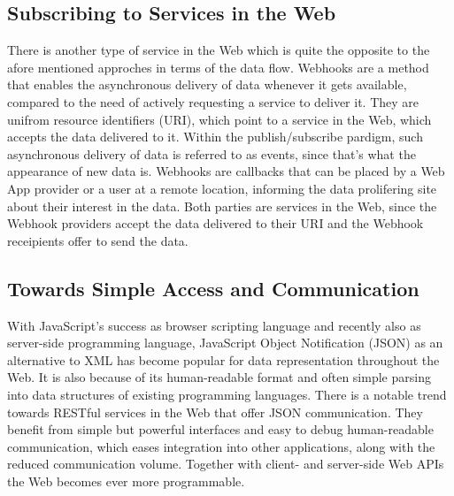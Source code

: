 \subsection{Subscribing to Services in the Web}
There is another type of service in the Web which is quite the opposite to the afore mentioned approches in terms of the data flow.
\textrm{Webhooks} are a method that enables the asynchronous delivery of data whenever it gets available, compared to the need of actively requesting a service to deliver it.
They are unifrom resource identifiers (\textrm{URI}), which point to a service in the Web, which accepts the data delivered to it.
Within the publish/subscribe pardigm, such asynchronous delivery of data is referred to as events, since that's what the appearance of new data is.
\textrm{Webhooks} are callbacks that can be placed by a \textrm{Web App} provider or a user at a remote location, informing the data prolifering site about their interest in the data.
Both parties are services in the Web, since the \textrm{Webhook} providers accept the data delivered to their \textrm{URI} and the \textrm{Webhook} receipients offer to send the data.


\subsection{Towards Simple Access and Communication}
With JavaScript's success as browser scripting language and recently also as server-side programming language, JavaScript Object Notification (\textrm{JSON}) as an alternative to \textrm{XML} has become popular for data representation throughout the Web.
It is also because of its human-readable format and often simple parsing into data structures of existing programming languages.
There is a notable trend towards \textrm{RESTful} services in the Web that offer \textrm{JSON} communication.
They benefit from simple but powerful interfaces and easy to debug human-readable communication, which eases integration into other applications, along with the reduced communication volume.
Together with client- and server-side \textrm{Web APIs} the Web becomes ever more programmable.



